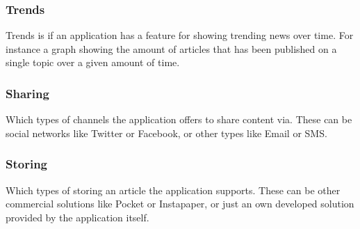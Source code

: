 \subsubsection{Trends}
Trends is if an application has a feature for showing trending news over time. For instance a graph showing the amount of articles that has been published on a single topic over a given amount of time.


\subsubsection{Sharing}
Which types of channels the application offers to share content via. These can be social networks like Twitter or Facebook, or other types like Email or SMS.

\subsubsection{Storing}
Which types of storing an article the application supports. These can be other commercial solutions like Pocket or Instapaper, or just an own developed solution provided by the application itself.


